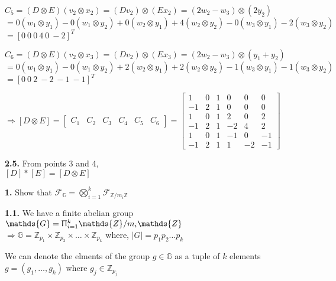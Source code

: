 \documentclass [12pt]{article}
\theoremstyle{definition}
\newcommand{\md}[1]{|#1|}
\newcommand{\im}[1]{\mathds{#1}/m_{i}\mathds{#1}}
\begin{document}
\phantom{1000em} $C_{5} = (D \otimes E)(v_{2} \otimes x_{2}) = (Dv_{2}) \otimes (Ex_{2}) = (2w_{2}-w_{3}) \otimes (2y_{2})$\\
\phantom{1000em} $= 0(w_{1} \otimes y_{1}) -0(w_{1} \otimes y_{2}) +0(w_{2} \otimes y_{1}) +4(w_{2} \otimes y_{2}) -0(w_{3} \otimes y_{1}) -2(w_{3} \otimes y_{2})$\\
\phantom{1000em} $= [0 \ 0 \ 0 \ 4 \ 0 \ -2]^{T}$

\phantom{1000em} $C_{6} = (D \otimes E)(v_{2} \otimes x_{3}) = (Dv_{2}) \otimes (Ex_{3}) = (2w_{2}-w_{3}) \otimes (y_{1}+y_{2})$\\
\phantom{1000em} $= 0(w_{1} \otimes y_{1}) -0(w_{1} \otimes y_{2}) +2(w_{2} \otimes y_{1}) +2(w_{2} \otimes y_{2}) -1(w_{3} \otimes y_{1}) -1(w_{3} \otimes y_{2})$\\
\phantom{1000em} $= [0 \ 0 \ 2 \ -2 \ -1 \ -1]^{T}$

\phantom{1000em} $\Rightarrow [D \otimes E] = \begin{bmatrix} C_{1} & C_{2} & C_{3} & C_{4} & C_{5} & C_{6} \end{bmatrix} = 
\begin{bmatrix} 
	1 & 0 & 1 & 0 & 0 & 0\\ 
   -1 & 2 & 1 & 0 & 0 & 0\\
    1 & 0 & 1 & 2 & 0 & 2\\
   -1 & 2 & 1 & -2 & 4 & 2\\
    1 & 0 & 1 & -1 & 0 & -1\\
    -1 & 2 & 1 & 1 & -2 & -1
\end{bmatrix}
$

\phantom{1em} {\bf 2.5.} From points 3 and 4,\\
\phantom{1000em} $[D] * [E] = [D \otimes E]$

\newpage

{\bf 1.} Show that $\mathcal{F}_{\mathds{G}} = \bigotimes\limits_{i=1}^{k}\mathcal{F}_{\im{Z}}$

\phantom{1em} {\bf 1.1.} We have a finite abelian group $\mathds{G} = \Uppi_{i=1}^{k}\im{Z}$\\
\phantom{1000em} $\Rightarrow \mathds{G} = \mathds{Z}_{p_{1}} \times \mathds{Z}_{p_{2}} \times \dots \times \mathds{Z}_{p_{k}}$ where, $\md{G} = p_{1}p_{2} \dots p_{k}$

\phantom{1000em} We can denote the elments of the group $g \in \mathds{G}$ as a tuple of $k$ elements\\
\phantom{1000em} $g = (g_{1}, \dots , g_{k})$ where $g_{j} \in \mathds{Z}_{p_{j}}$
\end{document}

